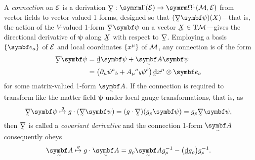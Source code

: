 A \emph{connection} on $\cal E$ is a derivation\footnotemark{} $\ts\nabla : \secs(\cal E) \to \forms^1(\cal M, \cal E)$ from vector fields to vector-valued 1-forms, designed so that $(\ts\nabla\bm\psi)(X)$---that is, the action of the $V$-valued 1-form $\ts\nabla\bm\psi$ on a vector $\ts X \in \T\cal M$---gives the directional derivative of $\bm\psi$ along $\ts X$ with respect to $\ts\nabla$.
Employing a basis $\qty{\bm e_a}$ of $\cal E$ and local coordinates $\qty{x^\mu}$ of $\cal M$, any connection is of the form
\begin{align}
	\ts\nabla \bm\psi &= \ts\dd\bm\psi + \tsbm A\bm\psi
\\	&= \qty(\partial_\mu\psi^a{}_b + A_\mu{}^a{}_b\psi^b) \, \ts\dd x^\mu \otimes \bm e_a
\end{align}
for some matrix-valued 1-form $\tsbm A$.
If the connection is required to transform like the matter field $\bm\psi$ under local gauge transformations, that is, as
\begin{align}
	\ts\nabla\bm\psi \overset{g}{\mapsto} g\cdot(\ts\nabla\bm\psi)
	= (g\cdot\ts\nabla)(g_\rho\bm\psi)
	= g_\rho\ts\nabla\bm\psi
,\end{align}
then $\ts\nabla$ is called a \emph{covariant derivative} and the connection 1-form $\tsbm A$ consequently obeys
\begin{align}
	\tsbm A \overset{g}{\mapsto} g\cdot\tsbm A = g_\rho\tsbm A g_\rho^{-1} - \qty(\ts\dd g_\rho)g_\rho^{-1}
.\end{align}


